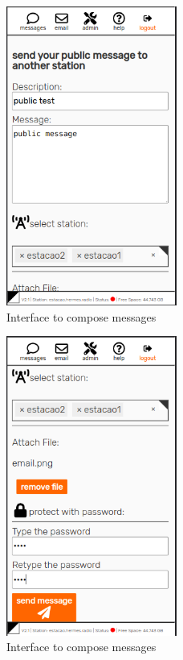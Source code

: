 \documentclass[11pt,a4paper]{article}
\begin{document}
\begin{figure}[H]
    \centering
    \includegraphics[width=0.5\textwidth]{screenshots/frontend/en/publicas.png}
    \caption{Interface to compose messages}
    \label{fig:compose}
\end{figure}

\begin{figure}[H]
    \centering
    \includegraphics[width=0.5\textwidth]{screenshots/frontend/en/publicas2.png}
    \caption{Interface to compose messages}
    \label{fig:compose}
\end{figure}
\end{document}
